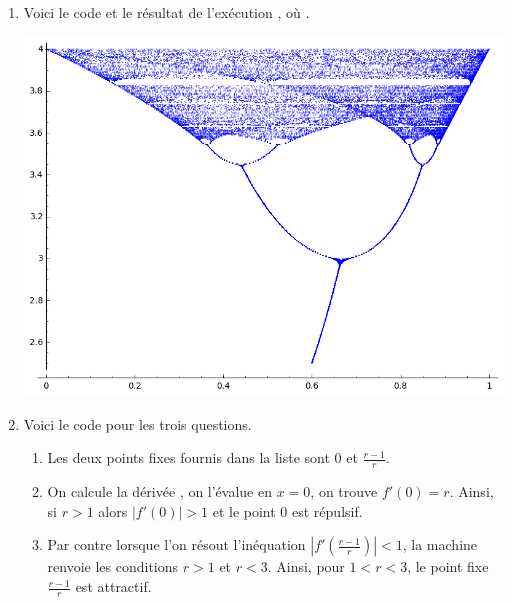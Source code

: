\documentclass[class=report,crop=false]{standalone}
\begin{document}
\begin{enumerate}
  
  
  \item Voici le code et le résultat de l’exécution ,
  où .
  
  
  \begin{center}
  \includegraphics[scale=0.7]{figures/chaos5}  
  \end{center} 

  \item Voici le code pour les trois questions.
    

  
    \begin{enumerate}
    \item Les deux points fixes fournis dans la liste 
    sont $0$ et $\frac{r-1}{r}$. 
    
    \item On calcule la dérivée , 
    on l'évalue en $x=0$, on trouve $f'(0)=r$. Ainsi, si $r>1$ alors
    $|f'(0)|>1$ et le point $0$ est répulsif. 
    
    \item Par contre lorsque l'on résout l'inéquation $|f'(\frac{r-1}{r})|<1$, 
    la machine renvoie les conditions $r>1$ et $r < 3$. 
    Ainsi, pour $1<r<3$, le point fixe $\frac{r-1}{r}$ est attractif.
  \end{enumerate} 
  

\end{enumerate}
\end{document}
